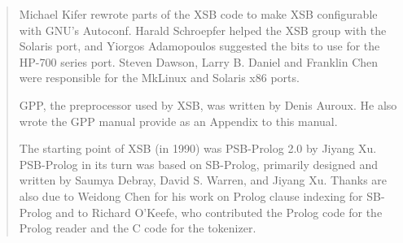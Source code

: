 \begin{quote}
Michael Kifer rewrote parts of the XSB code to make XSB configurable
with GNU's Autoconf.  Harald Schroepfer helped the XSB group with the
Solaris port, and Yiorgos Adamopoulos suggested the bits to use for
the HP-700 series port.  Steven Dawson, Larry B. Daniel and Franklin
Chen were responsible for the MkLinux and Solaris x86 ports.

GPP, the preprocessor used by XSB, was written by Denis Auroux.
He also wrote the GPP manual provide as an Appendix to this manual.

The starting point of XSB (in 1990) was PSB-Prolog 2.0 by Jiyang Xu.
PSB-Prolog in its turn was based on SB-Prolog, primarily designed and
written by Saumya Debray, David S. Warren, and Jiyang Xu.  Thanks are
also due to Weidong Chen for his work on Prolog clause indexing for
SB-Prolog and to Richard O'Keefe, who contributed the Prolog code for
the Prolog reader and the C code for the tokenizer.  

\end{quote}

